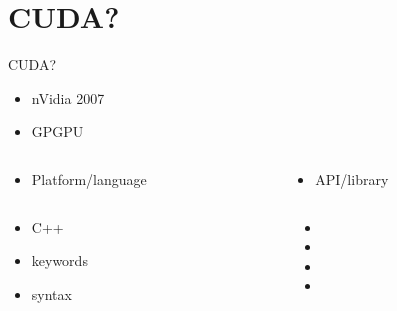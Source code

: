 \section{CUDA?}\label{sec:cuda?}
\mkAgenda

\begin{frame}{CUDA?}
    \center
    \begin{itemize}
        \item<1-> nVidia 2007
        \item<2-> GPGPU
    \end{itemize}

    \begin{columns}
        \begin{column}{0.4\textwidth}
            \begin{itemize} \item<3-> Platform/language \end{itemize}
        \end{column}
        \begin{column}{0.4\textwidth}
            \begin{itemize} \item<3-> API/library \end{itemize}
        \end{column}
    \end{columns}

    \begin{columns}
        \begin{column}{0.4\textwidth}
            \begin{itemize}
                \item[]<4-> C++
                \item[+]<5-> keywords {}
                \item[+]<6-> syntax {}
            \end{itemize}
        \end{column}

        \begin{column}{0.4\textwidth}
            \begin{itemize}
                \item[]<7-> {}
                \item[]<7-> {}
                \item[]<7-> {}
                \item[]<7-> {}
            \end{itemize}
        \end{column}
    \end{columns}
\end{frame}